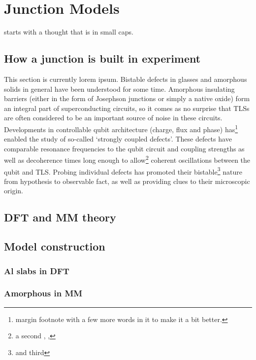 \chapter{Junction Models}

 starts with a thought that is in small caps.

\section{How a junction is built in experiment}

This section is currently lorem ipsum.
Bistable defects in glasses and amorphous solids in general have been understood for some time.
Amorphous insulating barriers (either in the form of Josephson junctions or simply a native oxide) form an integral part of superconducting circuits, so it comes as no surprise that TLSs are often considered to be an important source of noise in these circuits. 
Developments in controllable qubit architecture (charge, flux and phase) has\footnote{margin footnote with a few more words in it to make it a bit better.} enabled the study of so-called ‘strongly coupled defects’.
These defects have comparable resonance frequencies to the qubit circuit and coupling strengths as well as decoherence times long enough to allow\footnote{a second \the\marginparwidth, \the\marginparsep, \the\marginparpush} coherent oscillations between the qubit and TLS.
Probing individual defects has promoted their bistable\footnote{and third} nature from hypothesis to observable fact, as well as providing clues to their microscopic origin.

\section{DFT and MM theory}
\section{Model construction}
\subsection{Al slabs in DFT}
\subsection{Amorphous \texorpdfstring{}{AlOₓ} in MM}

